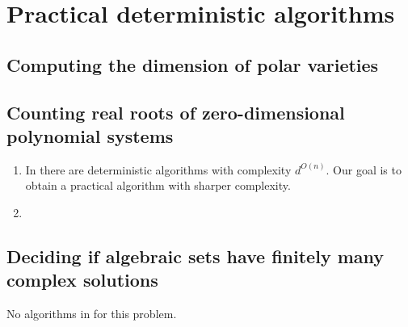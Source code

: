\documentclass[10pt]{article}
\theoremstyle{definition}
\begin{document}
\section{Practical deterministic algorithms}



\subsection{Computing the dimension of polar varieties}




\subsection{Counting real roots of zero-dimensional polynomial systems}
\begin{enumerate}
    \item In \cite{BasuPollackRoy2006} there are deterministic algorithms with complexity $d^{O(n)}$. Our goal is to obtain a practical algorithm with sharper complexity. 
    \item 
\end{enumerate}



\subsection{Deciding if algebraic sets have finitely many complex solutions}
No algorithms in \cite{BasuPollackRoy2006} for this problem. 



\newpage 


\newpage 
\end{document}
